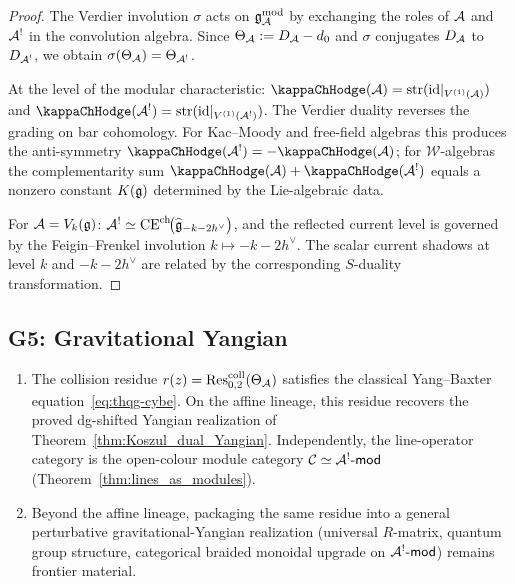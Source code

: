 \begin{proof}
The Verdier involution $\sigma$ acts on $\mathfrak{g}_{\mathcal{A}}^{\mathrm{mod}}$ by exchanging the
roles of $\mathcal{A}$ and $\mathcal{A}^!$ in the convolution algebra. Since
$\Theta_{\mathcal{A}} := D_{\mathcal{A}} - d_0$ and $\sigma$ conjugates $D_{\mathcal{A}}$ to
$D_{\mathcal{A}^!}$, we obtain $\sigma(\Theta_{\mathcal{A}}) = \Theta_{\mathcal{A}^!}$.

At the level of the modular characteristic:
$\kappaChHodge(\cA) = \operatorname{str}(\id|_{V^{(1)}(\cA)})$ and
$\kappaChHodge(\cA^!) = \operatorname{str}(\id|_{V^{(1)}(\cA^!)})$.
The Verdier duality reverses the grading on bar cohomology.
For Kac--Moody and free-field algebras this produces the
anti-symmetry $\kappaChHodge(\cA^!) = -\kappaChHodge(\cA)$; for $\mathcal{W}$-algebras
the complementarity sum $\kappaChHodge(\cA) + \kappaChHodge(\cA^!)$ equals a nonzero
constant $K(\mathfrak{g})$ determined by the Lie-algebraic data.

For $\mathcal{A} = V_k(\mathfrak{g})$:
$\mathcal{A}^!\simeq
\operatorname{CE}^{\mathrm{ch}}\!\bigl(\widehat{\mathfrak g}_{-k-2h^\vee}\bigr)$,
and the reflected current level is governed by the Feigin--Frenkel
involution $k \mapsto -k - 2h^\vee$. The scalar current shadows at
level $k$ and $-k - 2h^\vee$ are related by the corresponding
$S$-duality transformation.
\end{proof}


\subsection{G5: Gravitational Yangian}

\begin{theorem}
\begin{enumerate}[label=\textup{(\alph*)}]
\item \ClaimStatusConditional\;%
 The collision residue $r(z) = \operatorname{Res}^{\mathrm{coll}}_{0,2}(\Theta_{\mathcal{A}})$
 satisfies the classical Yang--Baxter
 equation~\eqref{eq:thqg-cybe}.
 On the affine lineage, this residue recovers the proved
 dg-shifted Yangian realization of
 Theorem~\textup{\ref{thm:Koszul_dual_Yangian}}.
 Independently, the line-operator category is the
 open-colour module category
 $\mathcal{C} \simeq \mathcal{A}^!\text{-}\mathsf{mod}$
 \textup{(}Theorem~\textup{\ref{thm:lines_as_modules}}\textup{)}.
\item \ClaimStatusConjectured\;%
 Beyond the affine lineage, packaging the same residue
 into a general perturbative gravitational-Yangian
 realization \textup{(}universal $R$-matrix, quantum
 group structure, categorical braided monoidal upgrade on
 $\mathcal{A}^!\text{-}\mathsf{mod}$\textup{)} remains frontier
 material.
\end{enumerate}
\end{theorem}

